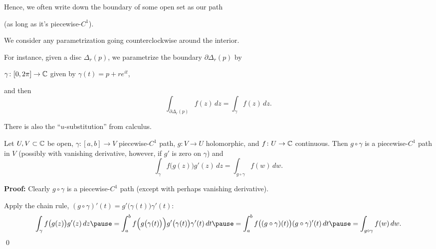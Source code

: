 \documentclass[10pt,aspectratio=169]{beamer}
\begin{document}
\begin{frame}
Hence, we often write down the
boundary of some open set as our path

(as long as it's piecewise-$C^1$).

\medskip
\pause

We consider any parametrization going counterclockwise around the interior.

\medskip
\pause

For instance, given a disc $\Delta_r(p)$, we parametrize
the boundary $\partial \Delta_r(p)$ by

$\gamma  \colon [0,2\pi] \to {\mathbb{C}}$ given by $\gamma(t) = p + re^{it}$,

\medskip
\pause

and then 
\begin{equation*}
\int_{\partial \Delta_r(p)} f(z) \, dz
=
\int_{\gamma} f(z) \, dz .
\end{equation*}
\end{frame}

\begin{frame}
There is also the ``$u$-substitution'' from calculus.
\pause

\begin{proposition}
Let $U,V \subset {\mathbb{C}}$ be open, $\gamma \colon [a,b] \to V$ 
piecewise-$C^1$ path, $g \colon V \to U$ holomorphic, and $f \colon U \to {\mathbb{C}}$
continuous.
\pause
Then $g \circ \gamma$ is a piecewise-$C^1$ path in $V$
(possibly with vanishing derivative, however, if $g'$ is zero on $\gamma$) and
\pause
\begin{equation*}
\int_{\gamma} f\bigl(g(z)\bigr) g'(z) \, dz
=
\int_{g \circ \gamma} f(w) \, dw .
\end{equation*}
\end{proposition}

\pause
\textbf{Proof:}
Clearly $g \circ \gamma$ is a piecewise-$C^1$ path (except with perhaps
vanishing derivative).

\medskip
\pause
Apply the chain rule,
$(g \circ \gamma)'(t) = g'\bigl(\gamma(t)\bigr) \gamma'(t)$:
\pause
\[
\int_{\gamma} f\bigl(g(z)\bigr) g'(z) \, dz
\pause
=
\int_a^b
f\Bigl(g\bigl(\gamma(t)\bigr)\Bigr) g'\bigl(\gamma(t)\bigr) \gamma'(t) \, dt
\pause
=
\int_a^b
f\bigl((g \circ \gamma)(t)\bigr) (g \circ \gamma)'(t) \, dt
\pause
=
\int_{g \circ \gamma} f(w) \, dw .
\]
\qed
\end{frame}
\end{document}

